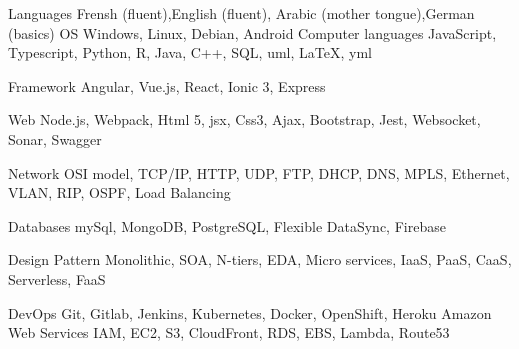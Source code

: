 

\begin{cvskills}
  \cvskill
    {Languages } %
    {Frensh  (fluent),English (fluent), Arabic (mother tongue),German (basics)} %
  \cvskill
    {OS} %
    {Windows, Linux, Debian, Android} %
  \cvskill
    {Computer languages} %
    {JavaScript, Typescript, Python, R, Java, C++, SQL, uml, LaTeX, yml} %

  \cvskill
    {Framework} %
    {Angular, Vue.js, React, Ionic 3, Express} %
    

  \cvskill
    {Web} %
    {Node.js, Webpack, Html 5, jsx, Css3, Ajax, Bootstrap, Jest, Websocket, Sonar, Swagger} %



  \cvskill
    {Network} %
    {OSI model, TCP/IP, HTTP, UDP, FTP, DHCP, DNS, MPLS, Ethernet, VLAN, RIP, OSPF, Load Balancing   } %

  \cvskill
    {Databases} %
    {mySql, MongoDB, PostgreSQL, Flexible DataSync, Firebase } %

  \cvskill
    {Design Pattern} %
    {Monolithic, SOA, N-tiers, EDA, Micro services, IaaS, PaaS, CaaS, Serverless, FaaS } %

  \cvskill
    {DevOps} %
    {Git, Gitlab, Jenkins, Kubernetes, Docker, OpenShift, Heroku  } %
\cvskill
    {Amazon Web Services} %
    {IAM, EC2, S3, CloudFront, RDS, EBS, Lambda, Route53 } %


\end{cvskills}
